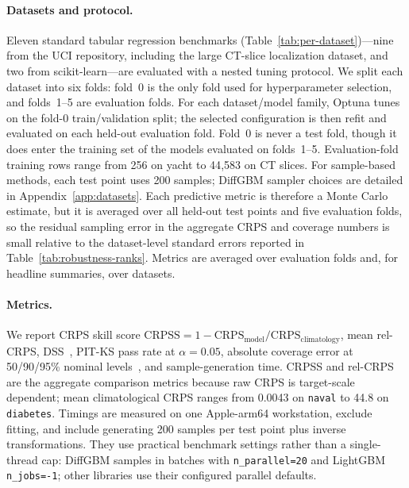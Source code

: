\documentclass{article}
\newcommand{\crps}{\mathrm{CRPS}}
\newcommand{\crpss}{\mathrm{CRPSS}}
\begin{document}
\paragraph{Datasets and protocol.} Eleven standard tabular regression benchmarks (Table~\ref{tab:per-dataset})---nine from the UCI repository, including the large CT-slice localization dataset, and two from scikit-learn---are evaluated with a nested tuning protocol. We split each dataset into six folds: fold~0 is the only fold used for hyperparameter selection, and folds~1--5 are evaluation folds. For each dataset/model family, Optuna tunes on the fold-0 train/validation split; the selected configuration is then refit and evaluated on each held-out evaluation fold. Fold~0 is never a test fold, though it does enter the training set of the models evaluated on folds~1--5. Evaluation-fold training rows range from 256 on yacht to 44{,}583 on CT slices. For sample-based methods, each test point uses 200 samples; DiffGBM sampler choices are detailed in Appendix~\ref{app:datasets}. Each predictive metric is therefore a Monte Carlo estimate, but it is averaged over all held-out test points and five evaluation folds, so the residual sampling error in the aggregate CRPS and coverage numbers is small relative to the dataset-level standard errors reported in Table~\ref{tab:robustness-ranks}. Metrics are averaged over evaluation folds and, for headline summaries, over datasets.

\paragraph{Metrics.} We report CRPS skill score $\crpss = 1 - \crps_{\text{model}} / \crps_{\text{climatology}}$, mean rel-CRPS, DSS~\citep{dawid1984pit}, PIT-KS pass rate at $\alpha=0.05$, absolute coverage error at 50/90/95\% nominal levels~\citep{gneiting2007crps}, and sample-generation time. CRPSS and rel-CRPS are the aggregate comparison metrics because raw CRPS is target-scale dependent; mean climatological CRPS ranges from 0.0043 on \texttt{naval} to 44.8 on \texttt{diabetes}. Timings are measured on one Apple-arm64 workstation, exclude fitting, and include generating 200 samples per test point plus inverse transformations. They use practical benchmark settings rather than a single-thread cap: DiffGBM samples in batches with \texttt{n\_parallel=20} and LightGBM \texttt{n\_jobs=-1}; other libraries use their configured parallel defaults.
\end{document}
